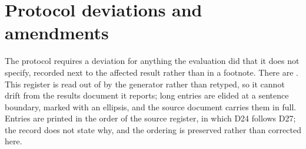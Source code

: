 \section{Protocol deviations and amendments}
\label{app:deviations}

The protocol requires a deviation for anything the evaluation did that it does not specify, recorded
next to the affected result rather than in a footnote. There are \vsevenDeviations{}. This register is
read out of  by the generator rather than retyped, so it cannot
drift from the results document it reports; long entries are elided at a sentence boundary, marked with an ellipsis, and the source
document carries them in full. Entries are printed in the order of the source register, in which
D24 follows D27; the record does not state why, and the ordering is preserved rather than
corrected here.

{\tabfont}
